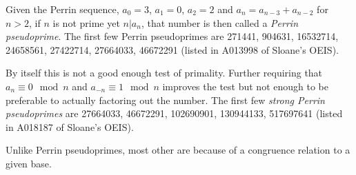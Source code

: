 \documentclass[12pt]{article}
\begin{document}
Given the Perrin sequence, $a_0 = 3$, $a_1 = 0$, $a_2 = 2$ and $a_n = a_{n - 3} + a_{n - 2}$ for $n > 2$, if $n$ is not prime yet $n|a_n$, that number is then called a {\em Perrin pseudoprime}. The first few Perrin pseudoprimes are 271441, 904631, 16532714, 24658561, 27422714, 27664033, 46672291 (listed in A013998 of Sloane's OEIS).

By itself this is not a good enough test of primality. Further requiring that $a_n \equiv 0 \mod n$ and $a_{-n} \equiv 1 \mod n$ improves the test but not enough to be preferable to actually factoring out the number. The first few {\em strong Perrin pseudoprimes} are 27664033, 46672291, 102690901, 130944133, 517697641 (listed in A018187 of Sloane's OEIS).

Unlike Perrin pseudoprimes, most other  are  because of a congruence relation to a given base.
\end{document}
